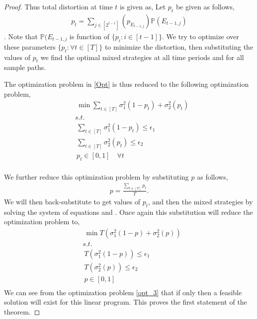 \documentclass[a4paper,english,12pt]{article}
\begin{document}
\begin{proof}
    Thus total distortion at time $t$ is given as,
Let $p_t$ be given as follows,
\begin{align}\label{soe1}
p_t=\sum_{ j \in [2^{t-1}]} (p_{E_{t-1,j}})\mathbb{P}(E_{t-1,j})
\end{align}. Note that $\mathbb{P}(E_{t-1,j}$ is function of $\{p_i: i \in [t-1]\}$. We try to optimize over these parameters $\{p_t: \forall t \in [T]\}$ to minimize the distortion, then substituting the values of $p_t$ we find the optimal mixed strategies at all time periods and for all sample paths.

The optimization problem in \ref{Opt} is thus reduced to the following optimization problem,
\begin{align}
& \ \min \sum_{ t \in [T]} \sigma_1^2(1-p_t)+\sigma_2^2(p_t)\\
& s.t. \nonumber\\
 &\ \sum_{t \in [T]} \sigma_1^2(1-p_t) \leq \epsilon_1  \nonumber\\
&\ \sum_{t \in [T]} \sigma_2^2(p_t) \leq \epsilon_2  \nonumber\\
&\ p_t \in [0,1] \quad \forall t \nonumber\\
\nonumber
\end{align}
 
 We further reduce this optimization problem by substituting $p$ as follows,
 \begin{align}\label{soe2}
 p=\frac{\sum_{ t \in [T]}p_t}{T}.
 \end{align} 
 We will then back-substitute to get values of $p_t$, and then the mixed strategies by solving the system of equations and .
 Once again this substitution  will reduce the optimization problem to,
 \begin{align}\label{opt_3}
& \ \min T(\sigma_1^2(1-p)+\sigma_2^2(p))\\
& s.t. \nonumber\\
 &\ T( \sigma_1^2(1-p) )\leq \epsilon_1  \nonumber\\
&\ T( \sigma_2^2(p)) \leq \epsilon_2  \nonumber\\
&\ p \in [0,1] \nonumber\\
\nonumber
\end{align}
 We can see from the optimization problem \ref{opt_3} that if
   only then a feasible solution will exist for this linear program. This proves the first statement of the theorem.
  

\end{proof}
\end{document}
